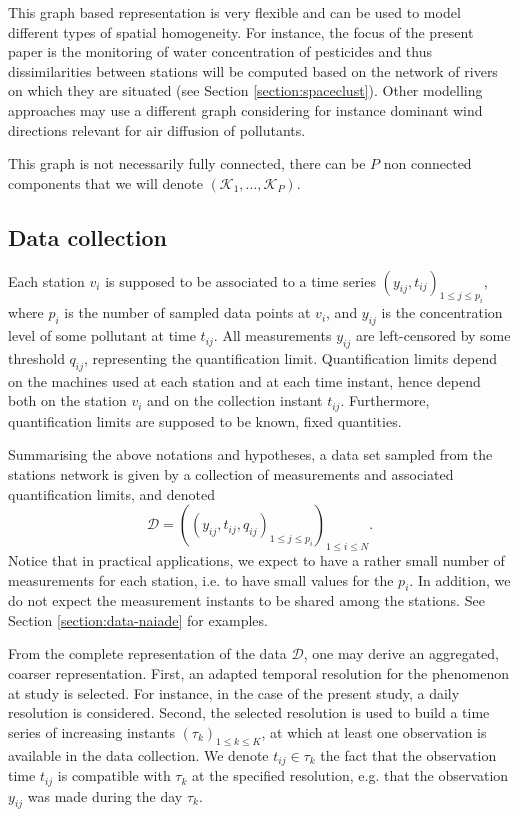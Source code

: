This graph based representation is very flexible and can be used to model different types of spatial homogeneity. For instance, the focus of the present paper is the monitoring of water concentration of pesticides and thus dissimilarities between stations will be computed based on the network of rivers on which they are situated (see Section \ref{section:spaceclust}). Other modelling approaches may use a different graph considering for instance dominant wind directions relevant for air diffusion of pollutants. 

This graph is not necessarily fully connected, there can be $P$ non connected components that we will denote $(\mathcal{K}_1,...,\mathcal{K}_P)$.

\subsection{Data collection}\label{subsection:data:collection}

Each station $v_i$ is supposed to be associated to a time series $(y_{ij},t_{ij})_{1\leq j\leq p_i}$, where $p_i$ is the number of sampled data points at $v_i$, and $y_{ij}$ is the concentration level of some pollutant at time $t_{ij}$. All measurements $y_{ij}$ are left-censored by some threshold $q_{ij}$, representing the quantification limit. Quantification limits depend on the machines used at each station and at each time instant, hence depend both on the station $v_i$ and on the collection instant $t_{ij}$. Furthermore, quantification limits are supposed to be known, fixed quantities. 

Summarising the above notations and hypotheses, a data set sampled from the stations network is given by a collection of measurements and associated quantification limits, and denoted
\begin{equation*}
 \mathcal{D}=\left(\left(y_{ij},t_{ij}, q_{ij}\right)_{1\leq j\leq p_i}\right)_{1\leq i\leq N}.   
\end{equation*}
Notice that in practical applications, we expect to have a rather small number of measurements for each station, i.e. to have small values for the $p_i$. In addition, we do not expect the measurement instants to be shared among the stations. See Section \ref{section:data-naiade} for examples. 


From the complete representation of the data $\mathcal{D}$, one may derive an aggregated, coarser representation. First, an adapted temporal resolution for the phenomenon at study is selected. For instance, in the case of the present study, a daily resolution is considered. Second, the selected resolution is used to build a time series of increasing instants $(\tau_k)_{1\leq k\leq K}$, at which at least one observation is available in the data collection. We denote $t_{ij}\in\tau_k$ the fact that the observation time $t_{ij}$ is compatible with $\tau_k$ at the specified resolution, e.g. that the observation $y_{ij}$ was made during the day $\tau_k$. 

